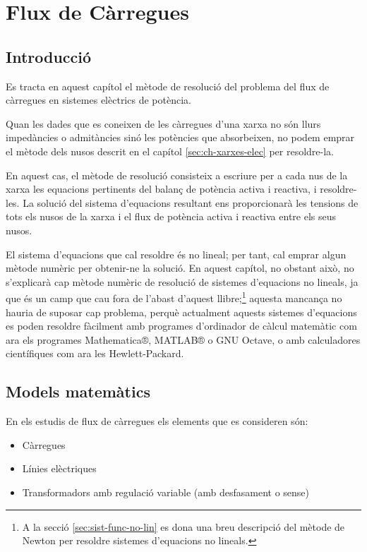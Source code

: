 
\chapter{Flux de Càrregues}
\label{sec:ch-flux-carregues}

\section{Introducció}

Es tracta en aquest capítol el mètode de resolució del problema del flux de càrregues en
sistemes elèctrics de potència.

Quan les dades que es coneixen de les càrregues d'una xarxa no són
llurs impedàncies o admitàncies sinó les potències que
absorbeixen, no podem emprar el mètode dels nusos descrit en el
capítol \ref{sec:ch-xarxes-elec} per  resoldre-la.

En aquest cas, el mètode de resolució consisteix a escriure per a cada
nus de la xarxa les equacions pertinents del balanç de potència activa i
reactiva, i resoldre-les. La solució del sistema d'equacions
resultant ens proporcionarà les tensions de tots els nusos de la
xarxa i el flux de potència activa i reactiva entre els seus nusos.

El sistema d'equacions que cal resoldre és no lineal;  per tant,
cal emprar algun mètode numèric per obtenir-ne la solució. En aquest capítol, no obstant això, no
s'explicarà cap mètode numèric de resolució de sistemes d'equacions
no lineals, ja que és un camp que cau fora de l'abast d'aquest llibre;\footnote{A la secció \ref{sec:sist-func-no-lin} es dona una breu descripció del mètode de Newton per resoldre sistemes d'equacions no lineals.} aquesta mancança  no hauria de suposar cap problema, perquè actualment aquests
sistemes d'equacions es poden resoldre fàcilment amb programes
d'ordinador de càlcul matemàtic com ara els programes
Mathematica®, MATLAB® o GNU Octave, o amb calculadores
científiques com ara les Hewlett-Packard.

\section{Models matemàtics} 

En els estudis de flux de càrregues els elements que es consideren són:
\begin{itemize}
   \item Càrregues
   \item Línies elèctriques
   \item Transformadors amb regulació variable (amb desfasament o sense)
\end{itemize}

